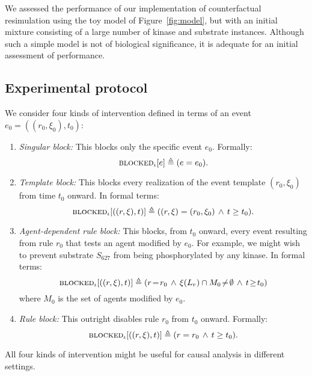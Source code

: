 
\newcommand{\subs}[2]{#1_{\textsf{#2}}}

We assessed the performance of our implementation of counterfactual
resimulation using the toy model of Figure~\ref{fig:model}, but with an initial
mixture consisting of a large number of kinase and substrate instances. Although
such a simple model is not of biological significance, it is adequate for an
initial assessment of performance.

\subsection{Experimental protocol}

We consider four kinds of intervention defined in terms of an event
$e_0=((r_0, \xi_0), t_0)$:
\begin{enumerate}[leftmargin=0.4cm]
\item \textit{Singular block:} This blocks only the specific event $e_0$. Formally: 
\[{\textsc{blocked}}_{\iota}[e] \triangleq (e = e_0).\]
\item \textit{Template block:} This blocks every realization of the event template $(r_0, \xi_0)$ from time $t_0$ onward. In formal terms:
\[{\textsc{blocked}}_{\iota}[((r, \xi), t)] \triangleq ((r, \xi) = (r_0, \xi_0)
\,\wedge\, t \geq t_0).\]
\item \textit{Agent-dependent rule block:} This blocks, from
$t_0$ onward, every event resulting from rule $r_0$ that tests an agent
modified by $e_0$. For example, we might wish to prevent substrate $S_{627}$ from being phosphorylated by any kinase. In formal terms: \[{\textsc{blocked}}_{\iota}[((r, \xi), t)] \triangleq (r \!=\! r_0 \,\wedge\, \xi(L_r)\cap M_0 \!\neq\! \emptyset \,\wedge\, t \!\geq\! t_0)\] where $M_0$ is the set of agents modified by $e_0$.
\item \textit{Rule block:} This outright disables rule
$r_0$ from $t_0$ onward. Formally: \[{\textsc{blocked}}_{\iota}[((r, \xi), t)] \triangleq (r = r_0 \,\wedge\, t \geq t_0).\]
\end{enumerate}
All four kinds of intervention might be useful for causal analysis in
different settings.


